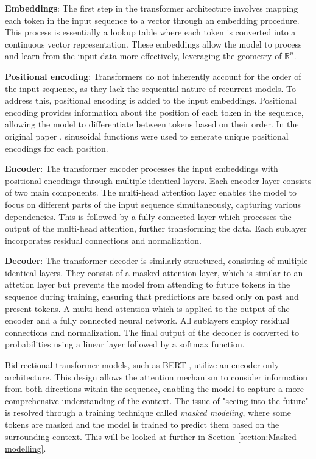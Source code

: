 \documentclass[../../thesis.tex]{subfiles}
\begin{document}
\textbf{Embeddings}: The first step in the transformer architecture involves mapping each token in the input sequence to a vector through an embedding procedure. This process is essentially a lookup table where each token is converted into a continuous vector representation. These embeddings allow the model to process and learn from the input data more effectively, leveraging the geometry of $\mathbb{R}^n$.
\newline

\textbf{Positional encoding}: Transformers do not inherently account for the order of the input sequence, as they lack the sequential nature of recurrent models. To address this, positional encoding is added to the input embeddings. Positional encoding provides information about the position of each token in the sequence, allowing the model to differentiate between tokens based on their order. In the original paper \cite{vaswani2023attention}, sinusoidal functions were used to generate unique positional encodings for each position.
\newline

\textbf{Encoder}: The transformer encoder processes the input embeddings with positional encodings through multiple identical layers. Each encoder layer consists of two main components. The multi-head attention layer enables the model to focus on different parts of the input sequence simultaneously, capturing various dependencies. This is followed by a fully connected layer which processes the output of the multi-head attention, further transforming the data. Each sublayer incorporates residual connections and normalization. 
\newline

\textbf{Decoder}: The transformer decoder is similarly structured, consisting of multiple identical layers. They consist of a masked attention layer, which is similar to an attetion layer but prevents the model from attending to future tokens in the sequence during training, ensuring that predictions are based only on past and present tokens. A multi-head attention which is applied to the output of the encoder and a fully connected neural network. All sublayers employ residual connections and normalization. The final output of the decoder is converted to probabilities using a linear layer followed by a softmax function.
\newline

Bidirectional transformer models, such as BERT \cite{devlin2019bert}, utilize an encoder-only architecture. This design allows the attention mechanism to consider information from both directions within the sequence, enabling the model to capture a more comprehensive understanding of the context. The issue of "seeing into the future" is resolved through a training technique called \textit{masked modeling}, where some tokens are masked and the model is trained to predict them based on the surrounding context. This will be looked at further in Section \ref{section:Masked modelling}.
\end{document}
